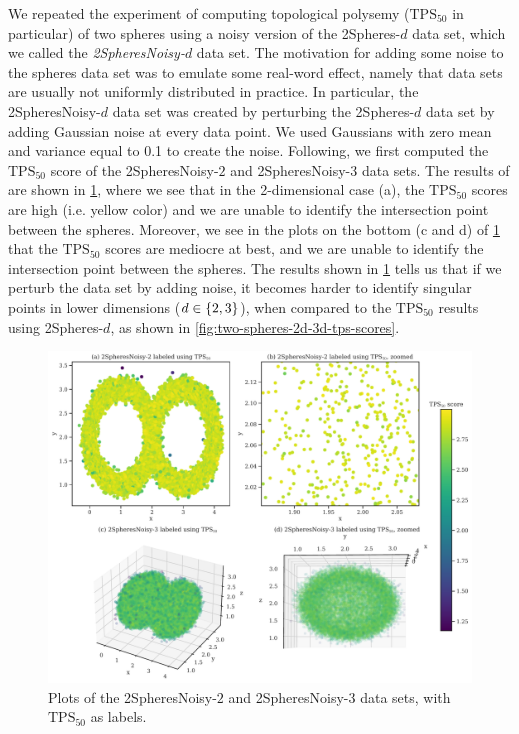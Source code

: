 We repeated the experiment of computing topological polysemy ($\text{TPS}_{50}$ in particular) of two spheres using a noisy version of the 2Spheres-$d$ data set, which we called the \textit{2SpheresNoisy-$d$} data set. The motivation for adding some noise to the spheres data set was to emulate some real-word effect, namely that data sets are usually not uniformly distributed in practice. In particular, the 2SpheresNoisy-$d$ data set was created by perturbing the 2Spheres-$d$ data set by adding Gaussian noise at every data point. We used Gaussians with zero mean and variance equal to 0.1 to create the noise. Following, we first computed the $\text{TPS}_{50}$ score of the 2SpheresNoisy-$2$ and 2SpheresNoisy-$3$ data sets. The results of are shown in \cref{fig:two-spheres-noisy-2d-3d-tps-scores}, where we see that in the 2-dimensional case (a), the $\text{TPS}_{50}$ scores are high (i.e. yellow color) and we are unable to identify the intersection point between the spheres. Moreover, we see in the plots on the bottom (c and d) of \cref{fig:two-spheres-noisy-2d-3d-tps-scores} that the $\text{TPS}_{50}$ scores are mediocre at best, and we are unable to identify the intersection point between the spheres. The results shown in \cref{fig:two-spheres-noisy-2d-3d-tps-scores} tells us that if we perturb the data set by adding noise, it becomes harder to identify singular points in lower dimensions ($d \in \left\{2, 3\right\}$), when compared to the $\text{TPS}_{50}$ results using 2Spheres-$d$, as shown in \cref{fig:two-spheres-2d-3d-tps-scores}.
\begin{figure}[H]
    \centering
    \includegraphics[width=\textwidth]{thesis/figures/two-spheres-noisy-2d-3d-tps-scores.pdf}
    \caption{Plots of the 2SpheresNoisy-$2$ and 2SpheresNoisy-$3$ data sets, with $\text{TPS}_{50}$ as labels.}
    \label{fig:two-spheres-noisy-2d-3d-tps-scores}
\end{figure}

